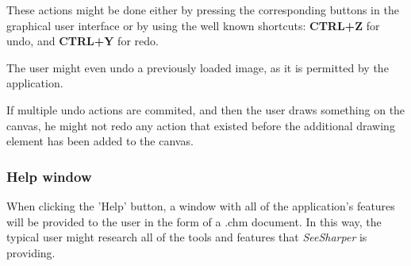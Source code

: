 \documentclass[12pt]{article}
\begin{document}
These actions might be done either by pressing the corresponding buttons in the graphical user interface or by using the well known shortcuts: \textbf{CTRL+Z} for undo, and \textbf{CTRL+Y} for redo.

The user might even undo a previously loaded image, as it is permitted by the application.

If multiple undo actions are commited, and then the user draws something on the canvas, he might not redo any action that existed before the additional drawing element has been added to the canvas.

\subsubsection{Help window}

When clicking the 'Help' button, a window with all of the application's features will be provided to the user in the form of a .chm document. In this way, the typical user might research all of the tools and features that \textit{SeeSharper} is providing.
\end{document}
